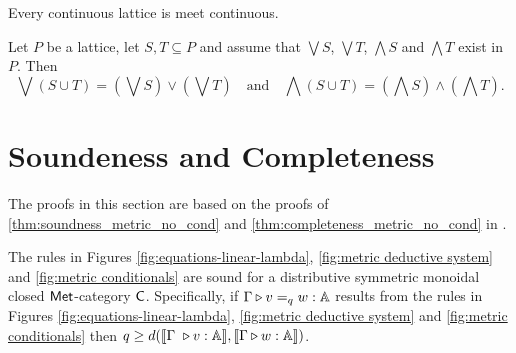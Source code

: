 \begin{lemma} \cite[Proposition I-1.8]{gierzContinuousLatticesDomains2003} \label{lem:meet_continuos}
  Every continuous lattice is meet continuous.
\end{lemma}

\begin{lemma} \cite[Lemma 2.23]{daveyIntroductionLatticesOrder2002} \label{lem:sup_union}
Let \( P \) be a lattice, let \( S, T \subseteq P \) and assume that \( \bigvee S \),
\( \bigvee T \), \( \bigwedge S \) and \( \bigwedge T \) exist in \( P \). Then
$$ \bigvee(S \cup T) = \left(\bigvee S\right) \vee \left(\bigvee T\right) \quad \text{and} \quad \bigwedge(S \cup T) = \left(\bigwedge S\right) \wedge \left(\bigwedge T\right) . $$
\end{lemma}


\section{Soundeness and Completeness}
The proofs in this section are based on the proofs of 
\autoref{thm:soundness_metric_no_cond} and \autoref{thm:completeness_metric_no_cond} in \cite{dahlqvist2022syntactic}.

\begin{theorem}
  The rules in Figures \ref{fig:equations-linear-lambda}, \ref{fig:metric deductive system} and \ref{fig:metric conditionals} are sound for a  distributive symmetric monoidal closed $\mathsf{Met}$-category $\mathsf{C}$. Specifically, if $\Gamma \triangleright v =_{q} w : \mathbb{A} $ results from the rules in Figures  \ref{fig:equations-linear-lambda}, \ref{fig:metric deductive system} and \ref{fig:metric conditionals} then $q \geq d( \llbracket \Gamma  \vljud v : \typeA \rrbracket, \llbracket\Gamma \vljud w : \typeA \rrbracket)$.
\end{theorem}

